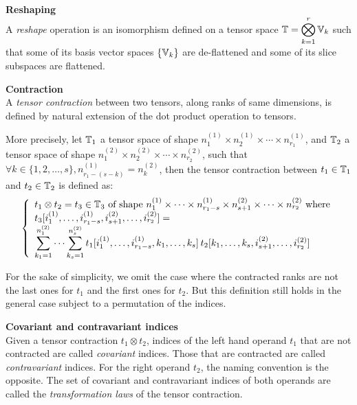 \begin{definition}\textbf{Reshaping}\\
A \emph{reshape} operation is an isomorphism defined on a tensor space $\mathbb{T} = \displaystyle \bigotimes_{k=1}^r \mathbb{V}_k$ such that some of its basis vector spaces $\{\mathbb{V}_k\}$ are de-flattened and some of its slice subspaces are flattened.
\end{definition}

\begin{definition}\textbf{Contraction}\\
A \emph{tensor contraction} between two tensors, along ranks of same dimensions, is defined by natural extension of the dot product operation to tensors.

More precisely, let $\mathbb{T}_1$ a tensor space of shape $n_1^{(1)} \times n_2^{(1)} \times \cdots \times n_{r_1}^{(1)}$, and $\mathbb{T}_2$ a tensor space of shape $n_1^{(2)} \times n_2^{(2)} \times \cdots \times n_{r_2}^{(2)}$, such that $\forall k \in \{1, 2, \ldots, s\}, n_{r_1-(s-k)}^{(1)} = n_k^{(2)}$, then the tensor contraction between $t_1 \in \mathbb{T}_1$ and $t_2 \in \mathbb{T}_2$ is defined as:
\begin{gather*}
\left\{
  \begin{array}{l}
    t_1 \otimes t_2 = t_3 \in \mathbb{T}_3 \text{ of shape } n_1^{(1)} \times \cdots \times n_{r_1-s}^{(1)} \times n_{s+1}^{(2)} \times \cdots \times n_{r_2}^{(2)}
    \text{ where} \\
    t_3[i_1^{(1)}, \ldots, i_{r_1-s}^{(1)}, i_{s+1}^{(2)}, \ldots, i_{r_2}^{(2)}] = \\
    \displaystyle \sum_{k_1=1}^{n_1^{(2)}} \cdots \sum_{k_s=1}^{n_s^{(2)}}
    t_1[i_1^{(1)}, \ldots, i_{r_1-s}^{(1)}, k_1, \ldots, k_s] \hspace{2pt}
    t_2[k_1, \ldots, k_s, i_{s+1}^{(2)}, \ldots, i_{r_2}^{(2)}]
  \end{array}
\right.
\end{gather*}
\end{definition}

For the sake of simplicity, we omit the case where the contracted ranks are not the last ones for $t_1$ and the first ones for $t_2$. But this definition still holds in the general case subject to a permutation of the indices.

\begin{definition}\textbf{Covariant and contravariant indices}\\
Given a tensor contraction $t_1 \otimes t_2$, indices of the left hand operand $t_1$ that are not contracted are called \emph{covariant} indices. Those that are contracted are called \emph{contravariant} indices. For the right operand $t_2$, the naming convention is the opposite. 
The set of covariant and contravariant indices of both operands are called the \emph{transformation laws} of the tensor contraction.
\end{definition}

